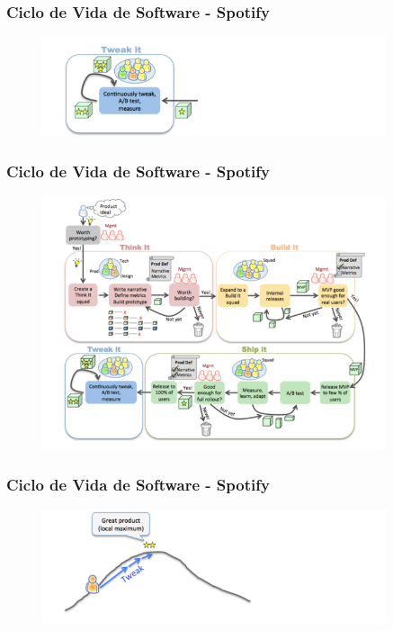 \begin{frame}
 \frametitle{Ciclo de Vida de Software - Spotify}
  \begin{figure}
   \centering
   \includegraphics[width = 0.9\textwidth]{figs/009.png}
  \end{figure}	
\end{frame}


\begin{frame}
 \frametitle{Ciclo de Vida de Software - Spotify}
  \begin{figure}
   \centering
   \includegraphics[width = 0.9\textwidth]{figs/012.png}
  \end{figure}	
\end{frame}

\begin{frame}
 \frametitle{Ciclo de Vida de Software - Spotify}
  \begin{figure}
   \centering
   \includegraphics[width = 0.9\textwidth]{figs/010.png}
  \end{figure}	
\end{frame}

